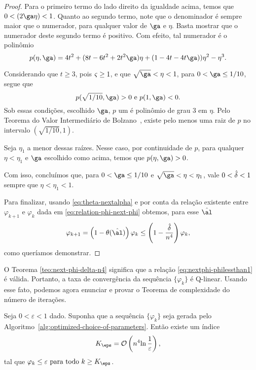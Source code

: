 \begin{proof}
	Para o primeiro termo do lado direito da igualdade acima, temos que $0 < (2\ga\eta) <1$.
	Quanto ao segundo termo, note que o denominador é  sempre maior que o numerador, para qualquer  valor de $\ga$ e $\eta$. Basta mostrar que  o numerador deste segundo termo  é positivo. Com efeito, tal numerador é o polinômio 
	\[
		p(\eta,\ga) =  4 t^2 + ( 8t - 6t^2 + 2t^2\ga) \eta + (1 - 4t - 4t   \ga) ) \eta^2 - \eta^3. 
	\]

	Considerando que $t\geq3$, pois $\varsigma\geq1$, e que $\sqrt{\ga}<\eta<1$, para $0 < \ga \leq 1/10$, segue que
	\[p(\sqrt{1/10},\ga) >0 \text{ e  } p(1,\ga) <0.\]
	Sob essas condições, escolhido $\ga$,  $p$ um é polinômio de grau 3 em $\eta$. Pelo Teorema do Valor Intermediário de Bolzano~\cite[Teorema 5.3.7]{Bartle:2011tr},  existe pelo menos uma  raiz  de $p$ no intervalo $(\sqrt{1/10},1)$. 

	Seja $\eta_{1}$ a menor dessas raízes. Nesse caso, por continuidade de $p$, para qualquer $\eta  < \eta_{1}$ e $\ga$ escolhido como acima, temos que  $p(\eta,\ga) >0$. 

	Com isso, concluímos que,  para $0 < \ga \leq 1/10$ e  $\sqrt{\ga}<\eta<\eta_{1}$, vale  $0<\hat{\delta}<1$  sempre que $\eta < \eta_{1} < 1$.

	Para finalizar, usando \eqref{eq:theta-nextalpha} e por conta da relação existente entre $\varphi_{k+1}$ e $\varphi_{k}$ dada em   \eqref{eq:relation-phi-next-phi} obtemos, para esse $\nextal$
	\[
	\varphi_{k+1}= \left(1 - \theta(\nextal)\right)\varphi_{k} \leq 
	\left(1 - \frac{\hat{\delta}}{n^{4}}\right)\varphi_{k},
	\]
como queríamos demonstrar.
	\end{proof}



O Teorema \ref{teo:next-phi-delta-n4} significa que a relação \eqref{eq:nextphi-philessthan1}
é válida. Portanto, a taxa de convergência da sequência $\{\varphi_{k}\}$ é  Q-linear. Usando esse fato, podemos agora enunciar e provar o Teorema de complexidade do número de iterações. 


\begin{teo}
	\label{teo:alg-convergence-varphi} Seja $0 < \varepsilon <1$ dado. Suponha que a sequência $\{\varphi_{k}\}$ seja gerada pelo Algoritmo~\ref{alg:optimized-choice-of-parameters}.
	Então  existe um índice \[K_{\eps} =  \Oset\left(n^{4}{\ln\frac{1}{\varepsilon}}\right),\] tal que 
	 $\varphi_{k}\leq \varepsilon \text{ para todo } k \geq K_{\eps}$.
	 
\end{teo}

